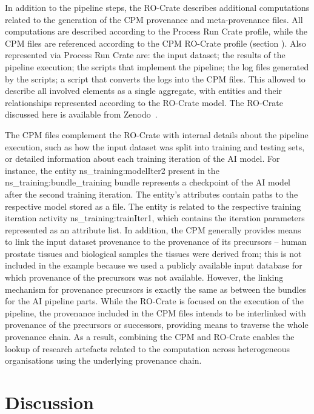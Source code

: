 \documentclass[10pt,letterpaper]{article}
\begin{document}
In addition to the pipeline steps, the RO-Crate describes additional computations related to the generation of the CPM provenance and meta-provenance files.
All computations are described according to the Process Run Crate profile, while the CPM files are referenced according to the CPM RO-Crate profile (section ).
Also represented via Process Run Crate are: the input dataset; the results of the pipeline execution; the scripts that implement the pipeline; the log files generated by the scripts; a script that converts the logs into the CPM files.
This allowed to describe all involved elements as a single aggregate, with entities and their relationships represented according to the RO-Crate model.
The RO-Crate discussed here is available from Zenodo~\cite{Wittner 2023}.

The CPM files complement the RO-Crate with internal details about the pipeline execution, such as how the input dataset was split into training and testing sets, or detailed information about each training iteration of the AI model.
For instance, the entity ns\_training:modelIter2 present in the ns\_training:bundle\_training bundle represents a checkpoint of the AI model after the second training iteration.
The entity's attributes contain paths to the respective model stored as a file.
The entity is related to the respective training iteration activity ns\_training:trainIter1, which contains the iteration parameters represented as an attribute list.
In addition, the CPM generally provides means to link the input dataset provenance to the provenance of its precursors -- human prostate tissues and biological samples the tissues were derived from; this is not included in the example because we used a publicly available input database for which provenance of the precursors was not available.
However, the linking mechanism for provenance precursors is exactly the same as between the bundles for the AI pipeline parts.
While the RO-Crate is focused on the execution of the pipeline, the provenance included in the CPM files intends to be interlinked with provenance of the precursors or successors, providing means to traverse the whole provenance chain.
As a result, combining the CPM and RO-Crate enables the lookup of research artefacts related to the computation across heterogeneous organisations using the underlying provenance chain.


%
\section{Discussion}\label{discussion}
\end{document}
